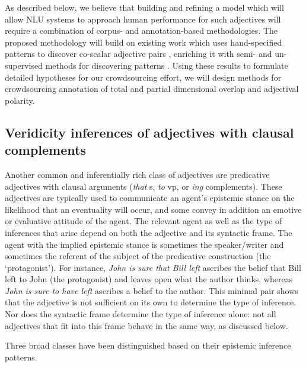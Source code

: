 \documentclass[10pt]{article}
\begin{document}
As described below, we believe that building and refining a model which will allow NLU systems to approach human performance for such adjectives will require a combination of corpus- and annotation-based methodologies. The proposed methodology will build on existing work which uses hand-specified patterns to discover co-scalar adjective pairs \cite{sheinman2009adjscales,sheinmanetal2013}, enriching it with semi- and un-supervised methods for discovering patterns \cite{snow04,davidov2008unsupervised,turney2008uniform}. Using these results to formulate detailed hypotheses for our crowdsourcing effort, we will design methods for crowdsourcing annotation of total and partial dimensional overlap and adjectival polarity. 

\vspace {-3mm}

\subsection{Veridicity inferences of adjectives with clausal complements}\label{sec-veridicity}
\vspace {-2mm}

Another common and inferentially rich class of adjectives are predicative adjectives with clausal arguments (\emph{that} {\sc s}, \emph{to} {\sc vp}, or \emph{ing} complements). These adjectives are typically used to communicate an agent's epistemic stance on the likelihood that an eventuality will occur, and some convey in addition an emotive or evaluative attitude of the agent. The relevant agent as well as the type of inferences that arise depend
on both the adjective and its syntactic frame.  The agent with the
implied epistemic stance is sometimes the speaker/writer and sometimes
the referent of the subject of the predicative construction (the
`protagonist').  For instance, \textit{John is sure that Bill left}
ascribes the belief that Bill left to John (the protagonist) and
leaves open what the author thinks, whereas \textit{John is sure to have
left} ascribes a belief to the author. This minimal pair shows that the adjective is not sufficient on its own to determine the type of inference. 
Nor does the syntactic frame determine the type of inference alone: not all adjectives that fit into this frame behave in the same way, as discussed below.

Three broad classes have been distinguished based on their epistemic inference patterns. 
\end{document}
